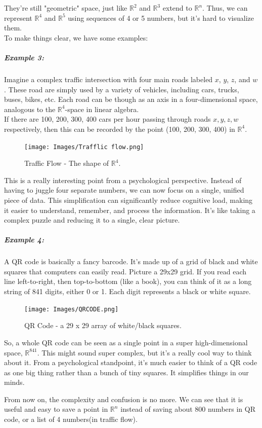 \documentclass[a4paper,12pt]{article}
\begin{document}
\begin{frame}
    \small They're still "geometric" space, just like \(\mathbb{R}^2\) and \( \mathbb{R}^3\) extend to \(\mathbb{R}^n\). Thus, we can represent \(\mathbb{R}^4\) and \(\mathbb{R}^5\) using sequences of 4 or 5 numbers, but it's hard to visualize them.\\

     To make things clear, we have some examples:\\
    \subparagraph{Example 3:} Imagine a complex traffic intersection with four main roads labeled \(x\), \(y\), \(z\), and \(w\). These road are simply used by a variety of vehicles, including cars, trucks, buses, bikes, etc. Each road can be though as an axis in a four-dimensional space, analogous to the \(\mathbb{R}^4\)-space in linear algebra.\\
    
    If there are 100, 200, 300, 400 cars per hour passing through roads \(x, y, z, w\) respectively, then this can be recorded by the point (100, 200, 300, 400) in \(\mathbb{R}^4\).\\ 

    \begin{figure}[H]
        \centering
        \texttt{[image: Images/Trafflic flow.png]}
        \caption{Traffic Flow - The shape of \(\mathbb{R}^4\).}
        \label{fig:enter-label}
    \end{figure}
    
    This is a really interesting point from a psychological perspective. Instead of having to juggle four separate numbers, we can now focus on a single, unified piece of data. This simplification can significantly reduce cognitive load, making it easier to understand, remember, and process the information. It's like taking a complex puzzle and reducing it to a single, clear picture.

    \subparagraph{Example 4:} A QR code is basically a fancy barcode. It's made up of a grid of black and white squares that computers can easily read. Picture a 29x29 grid. If you read each line left-to-right, then top-to-bottom (like a book), you can think of it as a long string of 841 digits, either 0 or 1. Each digit represents a black or white square.\\ 

    \begin{figure}[H]
        \centering
        \texttt{[image: Images/QRCODE.png]}
        \caption{QR Code - a 29 x 29 array of white/black squares.}
        \label{fig:enter-label}
    \end{figure}

    \small So, a whole QR code can be seen as a single point in a super high-dimensional space, \(\mathbb{R}^{841}\). This might sound super complex, but it's a really cool way to think about it. From a psychological standpoint, it's much easier to think of a QR code as one big thing rather than a bunch of tiny squares. It simplifies things in our minds.

    \small From now on, the complexity and confusion is no more. We can see that it is useful and easy to save a point in \(\mathbb{R}^n\) instead of saving about 800 numbers in QR code, or a list of 4 numbers(in traffic flow).
    \end{frame}
\end{document}

